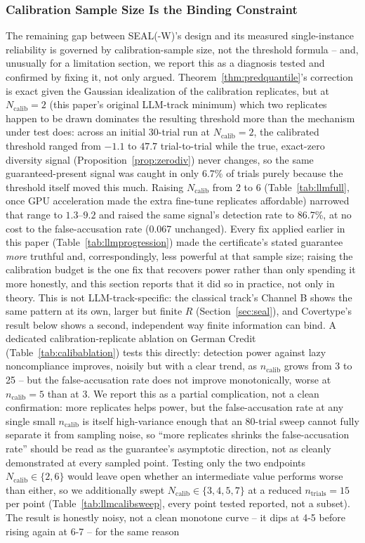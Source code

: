 \documentclass[10pt,journal,compsoc]{IEEEtran}
\begin{document}
\subsubsection{Calibration Sample Size Is the Binding Constraint}

The remaining gap between SEAL(-W)'s design and its measured single-instance reliability is governed by calibration-sample size, not the threshold formula -- and, unusually for a limitation section, we report this as a diagnosis tested and confirmed by fixing it, not only argued. Theorem~\ref{thm:predquantile}'s correction is exact given the Gaussian idealization of the calibration replicates, but at $N_{\text{calib}}=2$ (this paper's original LLM-track minimum) which two replicates happen to be drawn dominates the resulting threshold more than the mechanism under test does: across an initial 30-trial run at $N_{\text{calib}}=2$, the calibrated threshold ranged from $-1.1$ to $47.7$ trial-to-trial while the true, exact-zero diversity signal (Proposition~\ref{prop:zerodiv}) never changes, so the same guaranteed-present signal was caught in only 6.7\% of trials purely because the threshold itself moved this much. Raising $N_{\text{calib}}$ from 2 to 6 (Table~\ref{tab:llmfull}, once GPU acceleration made the extra fine-tune replicates affordable) narrowed that range to $1.3$--$9.2$ and raised the same signal's detection rate to 86.7\%, at no cost to the false-accusation rate (0.067 unchanged). Every fix applied earlier in this paper (Table~\ref{tab:llmprogression}) made the certificate's stated guarantee \emph{more} truthful and, correspondingly, less powerful at that sample size; raising the calibration budget is the one fix that recovers power rather than only spending it more honestly, and this section reports that it did so in practice, not only in theory. This is not LLM-track-specific: the classical track's Channel B shows the same pattern at its own, larger but finite $R$ (Section~\ref{sec:seal}), and Covertype's result below shows a second, independent way finite information can bind. A dedicated calibration-replicate ablation on German Credit (Table~\ref{tab:calibablation}) tests this directly: detection power against lazy noncompliance improves, noisily but with a clear trend, as $n_{\text{calib}}$ grows from 3 to 25 -- but the false-accusation rate does not improve monotonically, worse at $n_{\text{calib}}=5$ than at $3$. We report this as a partial complication, not a clean confirmation: more replicates helps power, but the false-accusation rate at any single small $n_{\text{calib}}$ is itself high-variance enough that an 80-trial sweep cannot fully separate it from sampling noise, so ``more replicates shrinks the false-accusation rate'' should be read as the guarantee's asymptotic direction, not as cleanly demonstrated at every sampled point. Testing only the two endpoints $N_{\text{calib}}\in\{2,6\}$ would leave open whether an intermediate value performs worse than either, so we additionally swept $N_{\text{calib}}\in\{3,4,5,7\}$ at a reduced $n_{\text{trials}}=15$ per point (Table~\ref{tab:llmcalibsweep}, every point tested reported, not a subset). The result is honestly noisy, not a clean monotone curve -- it dips at 4-5 before rising again at 6-7 -- for the same reason 
\end{document}
